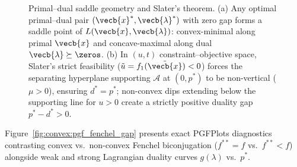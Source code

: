 \documentclass[../../../../master.tex]{subfiles}
\begin{document}
\begin{figure}[htbp]
\caption{Primal--dual saddle geometry and Slater's theorem. (a) Any optimal primal--dual pair $(\vecb{x}^*, \vecb{\lambda}^*)$ with zero gap forms a saddle point of $L(\vecb{x}, \vecb{\lambda})$: convex-minimal along primal $\vecb{x}$ and concave-maximal along dual $\vecb{\lambda} \succeq \zeros$. (b) In $(u, t)$ constraint--objective space, Slater's strict feasibility ($\tilde{u} = f_1(\tilde{\vecb{x}}) < 0$) forces the separating hyperplane supporting $\mathcal{A}$ at $(0, p^*)$ to be non-vertical ($\mu > 0$), ensuring $d^* = p^*$; non-convex dips extending below the supporting line for $u > 0$ create a strictly positive duality gap $p^* - d^* > 0$.}
\label{fig:convex:tikz_saddle}
\end{figure}

Figure~\ref{fig:convex:pgf_fenchel_gap} presents exact PGFPlots diagnostics contrasting convex vs.\ non-convex Fenchel biconjugation ($f^{**} = f$ vs.\ $f^{**} < f$) alongside weak and strong Lagrangian duality curves $g(\lambda)$ vs.\ $p^*$.
\end{document}
